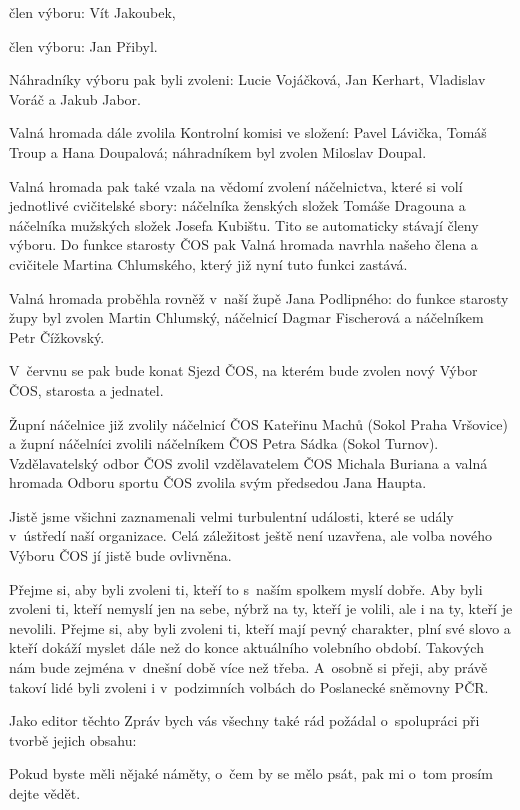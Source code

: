 \documentclass[11pt]{article}
\begin{document}
člen výboru: Vít Jakoubek,

člen výboru: Jan Přibyl.

\vspace*{12pt}

Náhradníky výboru pak byli zvoleni: Lucie Vojáčková, Jan Kerhart,
Vladislav Voráč a Jakub Jabor.

Valná hromada dále zvolila Kontrolní komisi ve složení: Pavel Lávička,
Tomáš Troup a Hana Doupalová; náhradníkem byl zvolen Miloslav Doupal.

Valná hromada pak také vzala na vědomí zvolení náčelnictva, které si
volí jednotlivé cvičitelské sbory: náčelníka ženských složek Tomáše
Dragouna a náčelníka mužských složek Josefa Kubištu. Tito se automaticky
stávají členy výboru. Do funkce starosty ČOS pak Valná hromada navrhla
našeho člena a cvičitele Martina Chlumského, který již nyní tuto funkci
zastává.

Valná hromada proběhla rovněž v~naší župě Jana Podlipného: do funkce
starosty župy byl zvolen Martin Chlumský, náčelnicí Dagmar Fischerová a
náčelníkem Petr Čížkovský.

V~červnu se pak bude konat Sjezd ČOS, na kterém bude zvolen nový Výbor
ČOS, starosta a jednatel.

Župní náčelnice již zvolily náčelnicí ČOS Kateřinu Machů (Sokol Praha
Vršovice) a župní náčelníci zvolili náčelníkem ČOS Petra Sádka (Sokol
Turnov). Vzdělavatelský odbor ČOS zvolil vzdělavatelem ČOS Michala
Buriana a valná hromada Odboru sportu ČOS zvolila svým předsedou Jana
Haupta.

Jistě jsme všichni zaznamenali velmi turbulentní události, které se
udály v~ústředí naší organizace. Celá záležitost ještě není uzavřena,
ale volba nového Výboru ČOS jí jistě bude ovlivněna.

Přejme si, aby byli zvoleni ti, kteří to s~naším spolkem myslí dobře.
Aby byli zvoleni ti, kteří nemyslí jen na sebe, nýbrž na ty, kteří je
volili, ale i na ty, kteří je nevolili. Přejme si, aby byli zvoleni ti,
kteří mají pevný charakter, plní své slovo a kteří dokáží myslet dále
než do konce aktuálního volebního období. Takových nám bude zejména
v~dnešní době více než třeba. A~osobně si přeji, aby právě takoví lidé
byli zvoleni i v~podzimních volbách do Poslanecké sněmovny PČR.

Jako editor těchto Zpráv bych vás všechny také rád požádal o~spolupráci
při tvorbě jejich obsahu:

Pokud byste měli nějaké náměty, o~čem by se mělo psát, pak mi o~tom
prosím dejte vědět.
\end{document}
